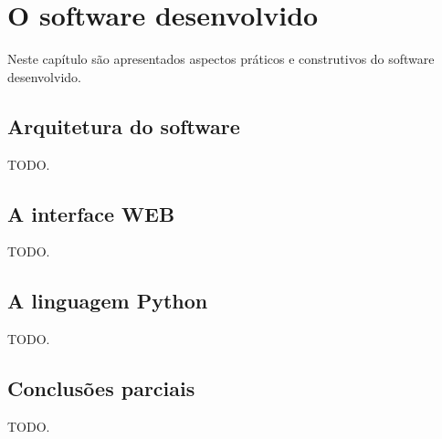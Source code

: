 \chapter{O software desenvolvido \label{cap:software}}

\vfill{}

Neste capítulo são apresentados aspectos práticos e construtivos do
software desenvolvido.

\newpage

\section{Arquitetura do software}

    TODO.

\section{A interface WEB}

    TODO.

\section{A linguagem Python}

    TODO.

\section{Conclusões parciais}

    TODO.
